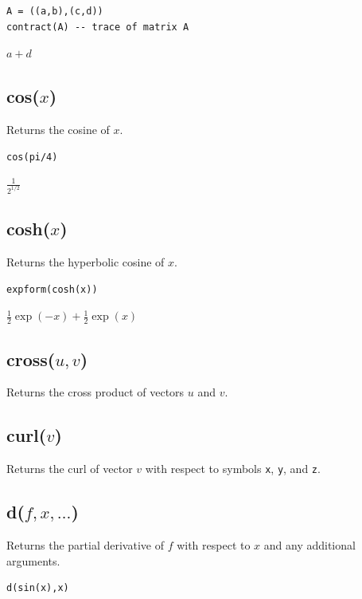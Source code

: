 \documentclass[12pt]{article}
\begin{document}
{\color{blue}
\begin{verbatim}
A = ((a,b),(c,d))
contract(A) -- trace of matrix A
\end{verbatim}
}

$a + d$

\subsection*{cos($x$)}

Returns the cosine of $x$.

{\color{blue}
\begin{verbatim}
cos(pi/4)
\end{verbatim}
}

$\displaystyle \frac{1}{2^{1/2}}$

\subsection*{cosh($x$)}

Returns the hyperbolic cosine of $x$.

{\color{blue}
\begin{verbatim}
expform(cosh(x))
\end{verbatim}
}

$\tfrac{1}{2}\exp(-x)+\tfrac{1}{2}\exp(x)$

\subsection*{cross($u,v$)}

Returns the cross product of vectors $u$ and $v$.

\subsection*{curl($v$)}

Returns the curl of vector $v$ with respect to symbols \verb$x$, \verb$y$, and \verb$z$.

\subsection*{d($f,x,\ldots$)}

Returns the partial derivative of $f$ with respect to $x$ and any additional arguments.

{\color{blue}
\begin{verbatim}
d(sin(x),x)
\end{verbatim}
}
\end{document}
